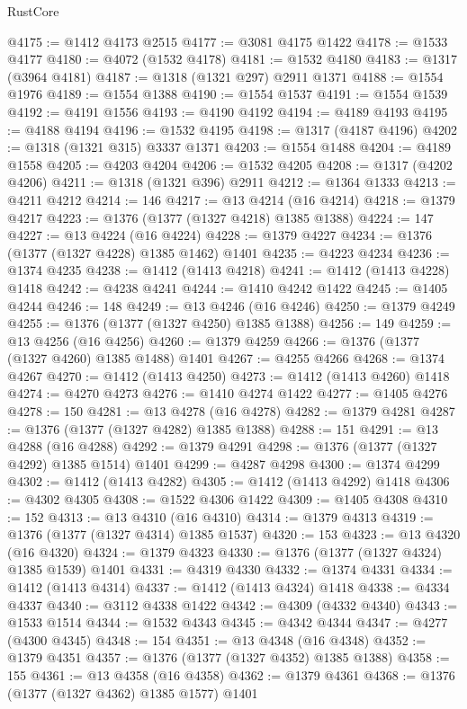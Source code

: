 \begin{lexlean}{RustCore}
\begin{coremodule}
@4175 := @1412 @4173 @2515
@4177 := @3081 @4175 @1422
@4178 := @1533 @4177
@4180 := @4072 (@1532 @4178)
@4181 := @1532 @4180
@4183 := @1317 (@3964 @4181)
@4187 := @1318 (@1321 @297) @2911 @1371
@4188 := @1554 @1976
@4189 := @1554 @1388
@4190 := @1554 @1537
@4191 := @1554 @1539
@4192 := @4191 @1556
@4193 := @4190 @4192
@4194 := @4189 @4193
@4195 := @4188 @4194
@4196 := @1532 @4195
@4198 := @1317 (@4187 @4196)
@4202 := @1318 (@1321 @315) @3337 @1371
@4203 := @1554 @1488
@4204 := @4189 @1558
@4205 := @4203 @4204
@4206 := @1532 @4205
@4208 := @1317 (@4202 @4206)
@4211 := @1318 (@1321 @396) @2911
@4212 := @1364 @1333
@4213 := @4211 @4212
@4214 := 146
@4217 := @13 @4214 (@16 @4214)
@4218 := @1379 @4217
@4223 := @1376 (@1377 (@1327 @4218) @1385 @1388)
@4224 := 147
@4227 := @13 @4224 (@16 @4224)
@4228 := @1379 @4227
@4234 := @1376 (@1377 (@1327 @4228) @1385 @1462) @1401
@4235 := @4223 @4234
@4236 := @1374 @4235
@4238 := @1412 (@1413 @4218)
@4241 := @1412 (@1413 @4228) @1418
@4242 := @4238 @4241
@4244 := @1410 @4242 @1422
@4245 := @1405 @4244
@4246 := 148
@4249 := @13 @4246 (@16 @4246)
@4250 := @1379 @4249
@4255 := @1376 (@1377 (@1327 @4250) @1385 @1388)
@4256 := 149
@4259 := @13 @4256 (@16 @4256)
@4260 := @1379 @4259
@4266 := @1376 (@1377 (@1327 @4260) @1385 @1488) @1401
@4267 := @4255 @4266
@4268 := @1374 @4267
@4270 := @1412 (@1413 @4250)
@4273 := @1412 (@1413 @4260) @1418
@4274 := @4270 @4273
@4276 := @1410 @4274 @1422
@4277 := @1405 @4276
@4278 := 150
@4281 := @13 @4278 (@16 @4278)
@4282 := @1379 @4281
@4287 := @1376 (@1377 (@1327 @4282) @1385 @1388)
@4288 := 151
@4291 := @13 @4288 (@16 @4288)
@4292 := @1379 @4291
@4298 := @1376 (@1377 (@1327 @4292) @1385 @1514) @1401
@4299 := @4287 @4298
@4300 := @1374 @4299
@4302 := @1412 (@1413 @4282)
@4305 := @1412 (@1413 @4292) @1418
@4306 := @4302 @4305
@4308 := @1522 @4306 @1422
@4309 := @1405 @4308
@4310 := 152
@4313 := @13 @4310 (@16 @4310)
@4314 := @1379 @4313
@4319 := @1376 (@1377 (@1327 @4314) @1385 @1537)
@4320 := 153
@4323 := @13 @4320 (@16 @4320)
@4324 := @1379 @4323
@4330 := @1376 (@1377 (@1327 @4324) @1385 @1539) @1401
@4331 := @4319 @4330
@4332 := @1374 @4331
@4334 := @1412 (@1413 @4314)
@4337 := @1412 (@1413 @4324) @1418
@4338 := @4334 @4337
@4340 := @3112 @4338 @1422
@4342 := @4309 (@4332 @4340)
@4343 := @1533 @1514
@4344 := @1532 @4343
@4345 := @4342 @4344
@4347 := @4277 (@4300 @4345)
@4348 := 154
@4351 := @13 @4348 (@16 @4348)
@4352 := @1379 @4351
@4357 := @1376 (@1377 (@1327 @4352) @1385 @1388)
@4358 := 155
@4361 := @13 @4358 (@16 @4358)
@4362 := @1379 @4361
@4368 := @1376 (@1377 (@1327 @4362) @1385 @1577) @1401

\end{coremodule}
\end{lexlean}
